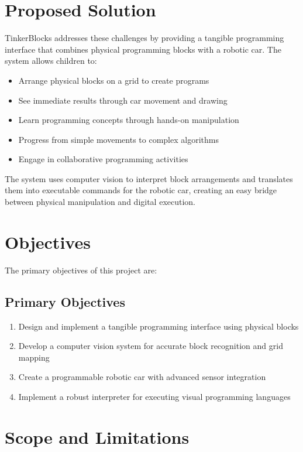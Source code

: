 \section{Proposed Solution}

TinkerBlocks addresses these challenges by providing a tangible programming interface that combines physical programming blocks with a robotic car. The system allows children to:

\begin{itemize}
    \item Arrange physical blocks on a grid to create programs
    \item See immediate results through car movement and drawing
    \item Learn programming concepts through hands-on manipulation
    \item Progress from simple movements to complex algorithms
    \item Engage in collaborative programming activities
\end{itemize}

The system uses computer vision to interpret block arrangements and translates them into executable commands for the robotic car, creating an easy bridge between physical manipulation and digital execution.

\section{Objectives}

The primary objectives of this project are:

\subsection{Primary Objectives}
\begin{enumerate}
    \item Design and implement a tangible programming interface using physical blocks
    \item Develop a computer vision system for accurate block recognition and grid mapping
    \item Create a programmable robotic car with advanced sensor integration
    \item Implement a robust interpreter for executing visual programming languages
\end{enumerate}


\section{Scope and Limitations}

